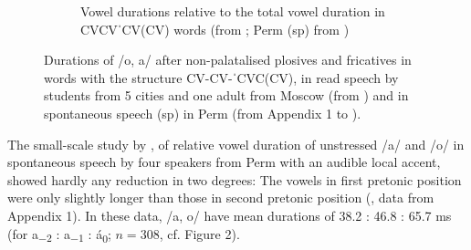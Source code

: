 \documentclass[output=paper]{langscibook}
\begin{document}
\begin{figure}
\begin{subfigure}{\textwidth}
\caption{Vowel durations relative to the total vowel duration in CVCVˈCV(CV) words
(from \protect\citealt{GrammatčikovaPožarickaja2013}; Perm (sp) from \protect\citealt{Erofeeva2005})}
\end{subfigure}
\caption{Durations of /o, a/ after non-palatalised plosives and fricatives in words with the structure CV-CV-ˈCVC(CV), in read speech by students from 5 cities and one adult from Moscow (from \citealt{GrammatčikovaPožarickaja2013}) and in spontaneous speech (sp) in Perm (from Appendix 1 to \citealt{Erofeeva2005}).}
\label{fig:post:2}
\end{figure}



The small-scale study by \citet{Erofeeva2005}, of relative vowel duration of unstressed \mbox{/a/} and \mbox{/o/} in spontaneous speech by four speakers from Perm with an audible local accent, showed hardly any reduction in two degrees: The vowels in first pretonic position were only slightly longer than those in second pretonic position (\citealt{Erofeeva2005}, data from Appendix 1). In these data, /a, o/ have mean durations of 38.2 : 46.8 : 65.7 ms (for a\textsubscript{$-2$} : a\textsubscript{$-1$} : á\textsubscript{0}; $n = 308$, cf. Figure 2).
\end{document}
